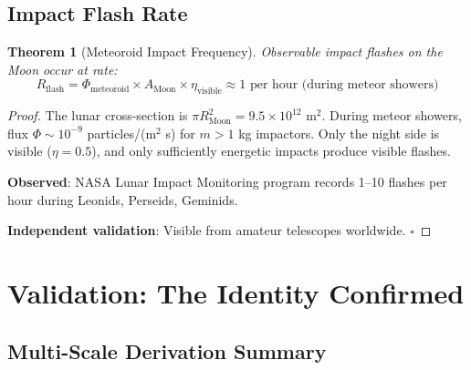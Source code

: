 \documentclass[12pt,a4paper]{article}
\newtheorem{theorem}{Theorem}[section]
\theoremstyle{definition}
\theoremstyle{remark}
\begin{document}
\subsection{Impact Flash Rate}

\begin{theorem}[Meteoroid Impact Frequency]
\label{thm:impacts}
Observable impact flashes on the Moon occur at rate:
\begin{equation}
R_{\text{flash}} = \Phi_{\text{meteoroid}} \times A_{\text{Moon}} \times \eta_{\text{visible}} \approx 1 \text{ per hour (during meteor showers)}
\end{equation}
\end{theorem}

\begin{proof}
The lunar cross-section is $\pi R_{\text{Moon}}^2 = 9.5 \times 10^{12}$ m$^2$. During meteor showers, flux $\Phi \sim 10^{-9}$ particles/(m$^2$ s) for $m > 1$ kg impactors. Only the night side is visible ($\eta = 0.5$), and only sufficiently energetic impacts produce visible flashes.

\textbf{Observed}: NASA Lunar Impact Monitoring program records 1--10 flashes per hour during Leonids, Perseids, Geminids.

\textbf{Independent validation}: Visible from amateur telescopes worldwide. $\square$
\end{proof}

\section{Validation: The Identity Confirmed}
\label{sec:validation}

\subsection{Multi-Scale Derivation Summary}
\end{document}
